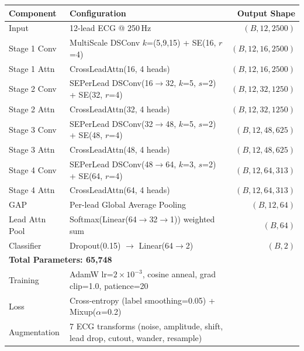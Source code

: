 \documentclass[border=8pt]{standalone}
\begin{document}
\begin{tabular}{l l r}
\toprule
\textbf{Component} & \textbf{Configuration} & \textbf{Output Shape} \\
\midrule
Input & 12-lead ECG @ 250\,Hz & $(B, 12, 2500)$ \\
\midrule
Stage 1 Conv & MultiScale DSConv $k$=(5,9,15) + SE(16, $r$=4) & $(B, 12, 16, 2500)$ \\
Stage 1 Attn & CrossLeadAttn(16, 4 heads) & $(B, 12, 16, 2500)$ \\
\midrule
Stage 2 Conv & SEPerLead DSConv(16$\to$32, $k$=5, $s$=2) + SE(32, $r$=4) & $(B, 12, 32, 1250)$ \\
Stage 2 Attn & CrossLeadAttn(32, 4 heads) & $(B, 12, 32, 1250)$ \\
\midrule
Stage 3 Conv & SEPerLead DSConv(32$\to$48, $k$=5, $s$=2) + SE(48, $r$=4) & $(B, 12, 48, 625)$ \\
Stage 3 Attn & CrossLeadAttn(48, 4 heads) & $(B, 12, 48, 625)$ \\
\midrule
Stage 4 Conv & SEPerLead DSConv(48$\to$64, $k$=3, $s$=2) + SE(64, $r$=4) & $(B, 12, 64, 313)$ \\
Stage 4 Attn & CrossLeadAttn(64, 4 heads) & $(B, 12, 64, 313)$ \\
\midrule
GAP & Per-lead Global Average Pooling & $(B, 12, 64)$ \\
Lead Attn Pool & Softmax(Linear(64$\to$32$\to$1)) weighted sum & $(B, 64)$ \\
Classifier & Dropout(0.15) $\to$ Linear(64$\to$2) & $(B, 2)$ \\
\midrule
\multicolumn{3}{l}{\textbf{Total Parameters: 65,748}} \\
\midrule
Training & AdamW lr=$2\times10^{-3}$, cosine anneal, grad clip=1.0, patience=20 & \\
Loss & Cross-entropy (label smoothing=0.05) + Mixup($\alpha$=0.2) & \\
Augmentation & 7 ECG transforms (noise, amplitude, shift, lead drop, cutout, wander, resample) & \\
\bottomrule
\end{tabular}
\end{document}
